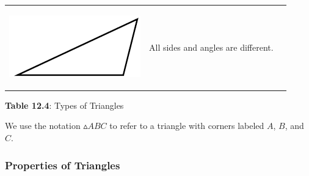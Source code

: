 \begin{center}
\begin{xtabular*}{\mytablewidth}[t]{|p{10\mystarwidth}|p{10\mystarwidth}|p{10\mystarwidth}|}
\begin{center}
    \label{m39368*id317668!!!underscore!!!media}\label{m39368*id317668!!!underscore!!!printimage}\includegraphics{col11306.imgs/m39368_MG10C13_026.png} %
      \vspace{2pt}
    \vspace{.1in}
    \end{center}    
                 &
        All sides and angles are different.%
     \tabularnewline{}
    \end{xtabular*}
      \end{center}
    \begin{center}{\small\bfseries Table 12.4}: Types of Triangles\end{center}
    \par
        \label{m39368*id317683}We use the notation $▵ABC$ to refer to a triangle with corners labeled \begin{math}A\end{math}, \begin{math}B\end{math}, and \begin{math}C\end{math}.\par 
        \label{m39368*uid40}
            \subsubsection{ Properties of Triangles}
            \nopagebreak
\label{m39368*secfhsst!!!underscore!!!id655}
